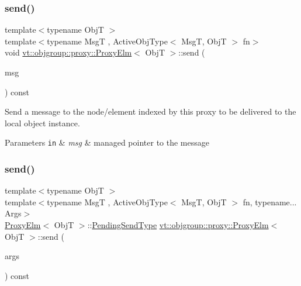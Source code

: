 \subsubsection{\texorpdfstring{send()}{send()}\hspace{0.1cm}{\footnotesize\ttfamily [2/4]}}
{\footnotesize\ttfamily template$<$typename ObjT $>$ \\
template$<$typename MsgT , Active\+Obj\+Type$<$ Msg\+T, Obj\+T $>$ fn$>$ \\
void \hyperlink{structvt_1_1objgroup_1_1proxy_1_1_proxy_elm}{vt\+::objgroup\+::proxy\+::\+Proxy\+Elm}$<$ ObjT $>$\+::send (\begin{DoxyParamCaption}\item[{\hyperlink{namespacevt_ab2b3d506ec8e8d1540aede826d84a239}{Msg\+Shared\+Ptr}$<$ MsgT $>$}]{msg }\end{DoxyParamCaption}) const}



Send a message to the node/element indexed by this proxy to be delivered to the local object instance. 


\begin{DoxyParams}[1]{Parameters}
\mbox{\tt in}  & {\em msg} & managed pointer to the message \\
\hline
\end{DoxyParams}
\mbox{\label{structvt_1_1objgroup_1_1proxy_1_1_proxy_elm_a00370ac0c4f3cf81b10685ea4963484d}} 
\subsubsection{\texorpdfstring{send()}{send()}\hspace{0.1cm}{\footnotesize\ttfamily [3/4]}}
{\footnotesize\ttfamily template$<$typename ObjT $>$ \\
template$<$typename MsgT , Active\+Obj\+Type$<$ Msg\+T, Obj\+T $>$ fn, typename... Args$>$ \\
\hyperlink{structvt_1_1objgroup_1_1proxy_1_1_proxy_elm}{Proxy\+Elm}$<$ ObjT $>$\+::\hyperlink{structvt_1_1objgroup_1_1proxy_1_1_proxy_elm_ab0f40d6a0191c974a4f4dd9dec0fc02f}{Pending\+Send\+Type} \hyperlink{structvt_1_1objgroup_1_1proxy_1_1_proxy_elm}{vt\+::objgroup\+::proxy\+::\+Proxy\+Elm}$<$ ObjT $>$\+::send (\begin{DoxyParamCaption}\item[{Args \&\&...}]{args }\end{DoxyParamCaption}) const}



